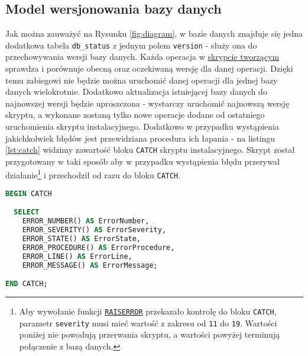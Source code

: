 \subsection{Model wersjonowania bazy danych}

Jak można zauważyć na Rysunku \ref{fig:diagram}, w bazie danych znajduje się jedna dodatkowa tabela \texttt{db\_status} z jednym polem \texttt{version} - służy ona do przechowywania wersji bazy danych.
Każda operacja w \href{run:skrypt_tworzacy_obiekty_w_bazie_danych.sql}{skrypcie tworzącym} sprawdza i porównuje obecną oraz oczekiwaną wersję dla danej operacji. 
Dzięki temu zabiegowi nie będzie można uruchomić danej operacji dla jednej bazy danych wielokrotnie. Dodatkowo aktualizacja istniejącej bazy danych do najnowszej wersji będzie uproszczona - wystarczy uruchomić najnowszą wersję skryptu, a wykonane zostaną tylko nowe operacje dodane od ostatniego uruchomienia skryptu instalacyjnego.
Dodatkowo w przypadku wystąpienia jakichkolwiek błędów jest przewidziana procedura ich łapania - na listingu \ref{lst:catch} widzimy zawartość bloku \texttt{CATCH} skryptu instalacyjnego. Skrypt został przygotowany w taki sposób aby w przypadku wystąpienia błędu przerywał działanie\footnote{Aby wywołanie funkcji \href{https://docs.microsoft.com/en-us/sql/t-sql/language-elements/raiserror-transact-sql?view=sql-server-2017}{\texttt{RAISERROR}} przekazało kontrolę do bloku \texttt{CATCH}, parametr \texttt{severity} musi mieć wartość z zakresu od \texttt{11} do \texttt{19}. Wartości poniżej nie powodują przerwania skryptu, a wartości powyżej terminują połączenie z bazą danych.} i przechodził od razu do bloku \texttt{CATCH}.

\begin{lstlisting}[language=SQL, caption=Blok CATCH w skrypcie tworzącym, label={lst:catch}]
BEGIN CATCH

  SELECT
    ERROR_NUMBER() AS ErrorNumber,
    ERROR_SEVERITY() AS ErrorSeverity,
    ERROR_STATE() AS ErrorState,
    ERROR_PROCEDURE() AS ErrorProcedure,
    ERROR_LINE() AS ErrorLine,
    ERROR_MESSAGE() AS ErrorMessage;

END CATCH;
\end{lstlisting}
